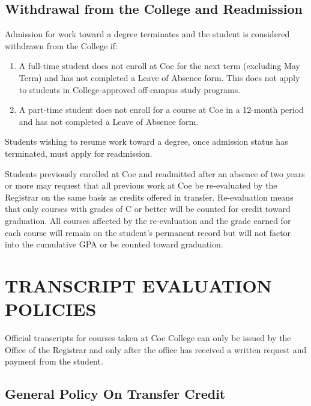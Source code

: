 \documentclass[
  letterpaper,
]{scrbook}
\providecommand{\tightlist}{%
  \setlength{\itemsep}{0pt}\setlength{\parskip}{0pt}}
\begin{document}
\section{Withdrawal from the College and
Readmission}\label{withdrawal-from-the-college-and-readmission}

Admission for work toward a degree terminates and the student is
considered withdrawn from the College if:

\begin{enumerate}
\def\labelenumi{\arabic{enumi}.}
\tightlist
\item
  A full-time student does not enroll at Coe for the next term
  (excluding May Term) and has not completed a Leave of Absence form.
  This does not apply to students in College-approved off-campus study
  programs.
\item
  A part-time student does not enroll for a course at Coe in a 12-month
  period and has not completed a Leave of Absence form.
\end{enumerate}

Students wishing to resume work toward a degree, once admission status
has terminated, must apply for readmission.

Students previously enrolled at Coe and readmitted after an absence of
two years or more may request that all previous work at Coe be
re-evaluated by the Registrar on the same basis as credits offered in
transfer. Re-evaluation means that only courses with grades of C or
better will be counted for credit toward graduation. All courses
affected by the re-evaluation and the grade earned for each course will
remain on the student's permanent record but will not factor into the
cumulative GPA or be counted toward graduation.

\chapter{TRANSCRIPT EVALUATION
POLICIES}\label{transcript-evaluation-policies}

Official transcripts for courses taken at Coe College can only be issued
by the Office of the Registrar and only after the office has received a
written request and payment from the student.

\section{General Policy On Transfer
Credit}\label{general-policy-on-transfer-credit}
\end{document}
